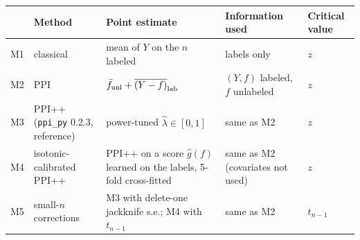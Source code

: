 \begin{tabular}{llp{3.4cm}p{2.6cm}l}
\toprule
 & Method & Point estimate & Information used & Critical value \\
\midrule
M1 & classical & mean of $Y$ on the $n$ labeled & labels only & $z$ \\
M2 & PPI & $\bar f_{\rm unl}+\overline{(Y-f)}_{\rm lab}$ & $(Y,f)$ labeled, $f$ unlabeled & $z$ \\
M3 & PPI++ (\texttt{ppi\_py} 0.2.3, reference) & power-tuned $\hat\lambda\in[0,1]$ & same as M2 & $z$ \\
M4 & isotonic-calibrated PPI++ & PPI++ on a score $\hat g(f)$ learned on the labels, 5-fold cross-fitted & same as M2 (covariates not used) & $z$ \\
M5 & small-$n$ corrections & M3 with delete-one jackknife s.e.; M4 with $t_{n-1}$ & same as M2 & $t_{n-1}$ \\
\bottomrule
\end{tabular}
